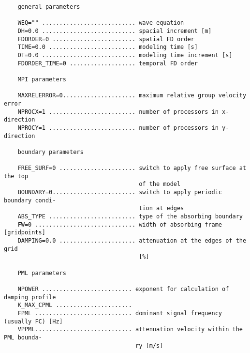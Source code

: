 \begin{verbatim}
    general parameters
    
    WEQ="" ........................... wave equation
    DH=0.0 ........................... spacial increment [m]
    FDORDER=0 ........................ spatial FD order 
    TIME=0.0 ......................... modeling time [s]
    DT=0.0 ........................... modeling time increment [s]
    FDORDER_TIME=0 ................... temporal FD order
    
    MPI parameters
    
    MAXRELERROR=0..................... maximum relative group velocity error
    NPROCX=1 ......................... number of processors in x-direction
    NPROCY=1 ......................... number of processors in y-direction
    
    boundary parameters
    
    FREE_SURF=0 ...................... switch to apply free surface at the top 
                                       of the model
    BOUNDARY=0........................ switch to apply periodic boundary condi- 
                                       tion at edges
    ABS_TYPE ......................... type of the absorbing boundary
    FW=0 ............................. width of absorbing frame [gridpoints]
    DAMPING=0.0 ...................... attenuation at the edges of the grid
                                       [%]
    
    PML parameters
    
    NPOWER .......................... exponent for calculation of damping profile
    K_MAX_CPML ...................... 
    FPML ............................ dominant signal frequency (usually FC) [Hz]
    VPPML............................ attenuation velocity within the PML bounda- 
                                      ry [m/s]
\end{verbatim}